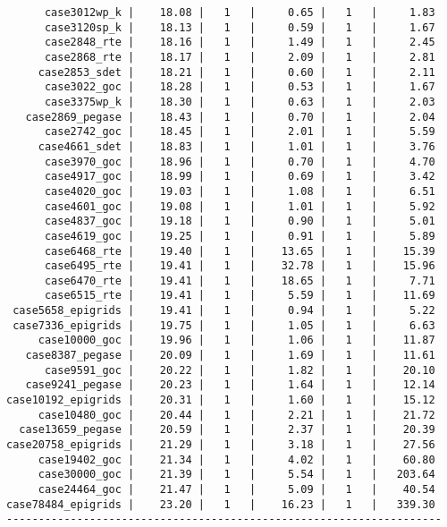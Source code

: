 \begin{lstlisting}
      case3012wp_k |    18.08 |   1   |     0.65 |   1   |     1.83
      case3120sp_k |    18.13 |   1   |     0.59 |   1   |     1.67
      case2848_rte |    18.16 |   1   |     1.49 |   1   |     2.45
      case2868_rte |    18.17 |   1   |     2.09 |   1   |     2.81
     case2853_sdet |    18.21 |   1   |     0.60 |   1   |     2.11
      case3022_goc |    18.28 |   1   |     0.53 |   1   |     1.67
      case3375wp_k |    18.30 |   1   |     0.63 |   1   |     2.03
   case2869_pegase |    18.43 |   1   |     0.70 |   1   |     2.04
      case2742_goc |    18.45 |   1   |     2.01 |   1   |     5.59
     case4661_sdet |    18.83 |   1   |     1.01 |   1   |     3.76
      case3970_goc |    18.96 |   1   |     0.70 |   1   |     4.70
      case4917_goc |    18.99 |   1   |     0.69 |   1   |     3.42
      case4020_goc |    19.03 |   1   |     1.08 |   1   |     6.51
      case4601_goc |    19.08 |   1   |     1.01 |   1   |     5.92
      case4837_goc |    19.18 |   1   |     0.90 |   1   |     5.01
      case4619_goc |    19.25 |   1   |     0.91 |   1   |     5.89
      case6468_rte |    19.40 |   1   |    13.65 |   1   |    15.39
      case6495_rte |    19.41 |   1   |    32.78 |   1   |    15.96
      case6470_rte |    19.41 |   1   |    18.65 |   1   |     7.71
      case6515_rte |    19.41 |   1   |     5.59 |   1   |    11.69
 case5658_epigrids |    19.41 |   1   |     0.94 |   1   |     5.22
 case7336_epigrids |    19.75 |   1   |     1.05 |   1   |     6.63
     case10000_goc |    19.96 |   1   |     1.06 |   1   |    11.87
   case8387_pegase |    20.09 |   1   |     1.69 |   1   |    11.61
      case9591_goc |    20.22 |   1   |     1.82 |   1   |    20.10
   case9241_pegase |    20.23 |   1   |     1.64 |   1   |    12.14
case10192_epigrids |    20.31 |   1   |     1.60 |   1   |    15.12
     case10480_goc |    20.44 |   1   |     2.21 |   1   |    21.72
  case13659_pegase |    20.59 |   1   |     2.37 |   1   |    20.39
case20758_epigrids |    21.29 |   1   |     3.18 |   1   |    27.56
     case19402_goc |    21.34 |   1   |     4.02 |   1   |    60.80
     case30000_goc |    21.39 |   1   |     5.54 |   1   |   203.64
     case24464_goc |    21.47 |   1   |     5.09 |   1   |    40.54
case78484_epigrids |    23.20 |   1   |    16.23 |   1   |   339.30
--------------------------------------------------------------------
\end{lstlisting}
    